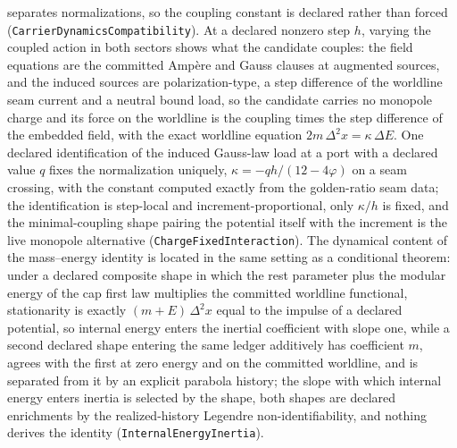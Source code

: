 \documentclass[11pt]{article}
\begin{document}
separates normalizations, so the coupling constant is declared rather than
forced (\texttt{CarrierDynamicsCompatibility}). At a
declared nonzero step \(h\), varying the coupled action in both sectors
shows what the candidate couples: the
field equations are the committed Ampère and Gauss clauses at augmented
sources, and the induced sources are polarization-type, a step difference
of the worldline seam current and a neutral bound load, so the candidate
carries no monopole charge and its force on the worldline is the coupling
times the step difference of the embedded field, with the exact worldline
equation \(2m\,\Delta^2 x = \kappa\,\Delta E\). One declared
identification of the induced Gauss-law load at a port with a declared
value \(q\) fixes the normalization uniquely,
\(\kappa=-qh/(12-4\varphi)\) on a seam crossing, with the constant
computed exactly from the golden-ratio seam data; the identification is
step-local and increment-proportional, only \(\kappa/h\) is fixed, and
the minimal-coupling shape pairing the potential itself with the increment
is the live monopole alternative
(\texttt{ChargeFixedInteraction}). The dynamical content
of the mass--energy identity is located in the same setting as a
conditional theorem: under a declared composite shape in which the rest
parameter plus the modular energy of the cap first law multiplies the
committed worldline functional, stationarity is exactly
\((m+E)\,\Delta^2 x\) equal to the impulse of a declared potential, so
internal energy enters the inertial coefficient with slope one, while a
second declared shape entering the same ledger additively has coefficient
\(m\), agrees with the first at zero energy and on the committed
worldline, and is separated from it by an explicit parabola history; the
slope with which internal energy enters inertia is selected by the shape,
both shapes are declared enrichments by the realized-history Legendre
non-identifiability, and nothing derives the identity
(\texttt{InternalEnergyInertia}).
\end{document}
